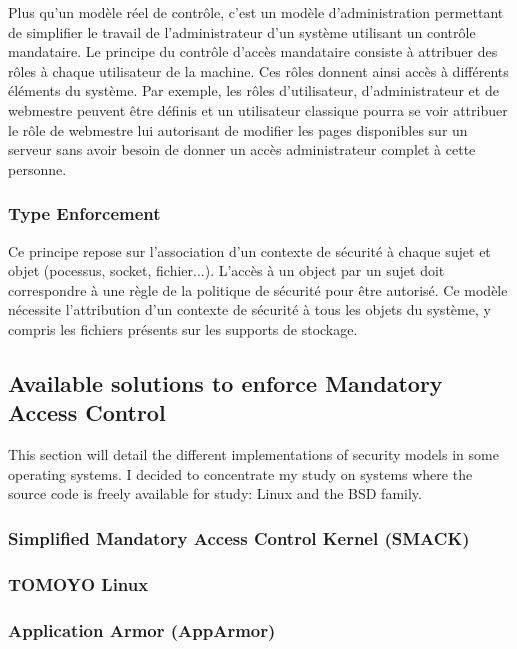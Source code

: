 \documentclass[pdftex,a4paper,titlepage,11pt]{article}
\begin{document}
Plus qu'un modèle réel de contrôle, c'est un modèle d'administration permettant de simplifier le travail de l'administrateur d'un système utilisant un contrôle mandataire. Le principe du contrôle d'accès mandataire consiste à attribuer des rôles à chaque utilisateur de la machine. Ces rôles donnent ainsi accès à différents éléments du système. Par exemple, les rôles d'utilisateur, d'administrateur et de webmestre peuvent être définis et un utilisateur classique pourra se voir attribuer le rôle de webmestre lui autorisant de modifier les pages disponibles sur un serveur sans avoir besoin de donner un accès administrateur complet à cette personne.

\subsubsection{Type Enforcement}

Ce principe repose sur l'association d'un contexte de sécurité à chaque sujet et objet (pocessus, socket, fichier...). L'accès à un object par un sujet doit correspondre à une règle de la politique de sécurité pour être autorisé. Ce modèle nécessite l'attribution d'un contexte de sécurité à tous les objets du système, y compris les fichiers présents sur les supports de stockage.

\subsection{Available solutions to enforce Mandatory Access Control}

This section will detail the different implementations of security models in some operating systems. I decided to concentrate my study on systems where the source code is freely available for study: Linux and the BSD family.

\subsubsection{Simplified Mandatory Access Control Kernel (SMACK)}

\subsubsection{TOMOYO Linux}

\subsubsection{Application Armor (AppArmor)}
\end{document}
